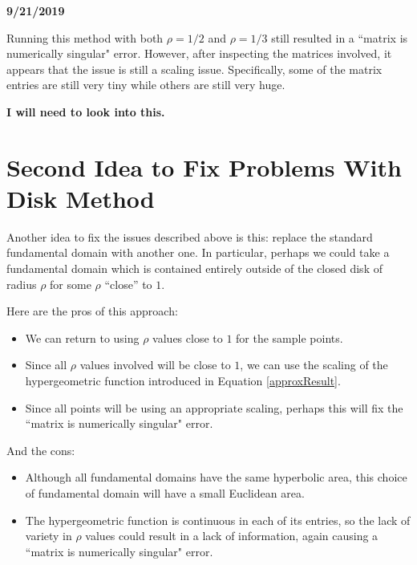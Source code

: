 \documentclass[]{article}
\begin{document}
\textbf{9/21/2019}

Running this method with both $\rho = 1/2$ and $\rho = 1/3$ still resulted in a ``matrix is numerically singular" error.
However, after inspecting the matrices involved, it appears that the issue is still a scaling issue.
Specifically, some of the matrix entries are still very tiny while others are still very huge.

\textbf{I will need to look into this.}

\section{Second Idea to Fix Problems With Disk Method}\label{fix2}

Another idea to fix the issues described above is this: replace the standard fundamental domain with another one.
In particular, perhaps we could take a fundamental domain which is contained entirely outside of the closed disk of radius $\rho$ for some $\rho$ ``close'' to $1$.

Here are the pros of this approach:
\begin{itemize}
	\item We can return to using $\rho$ values close to $1$ for the sample points.
	\item Since all $\rho$ values involved will be close to $1$, we can use the scaling of the hypergeometric function introduced in Equation \ref{approxResult}.
	\item Since all points will be using an appropriate scaling, perhaps this will fix the ``matrix is numerically singular" error.
\end{itemize}
And the cons:
\begin{itemize}
	\item Although all fundamental domains have the same hyperbolic area, this choice of fundamental domain will have a small Euclidean area.
	\item The hypergeometric function is continuous in each of its entries, so the lack of variety in $\rho$ values could result in a lack of information, again causing a ``matrix is numerically singular" error.
\end{itemize}
	
\end{document}

